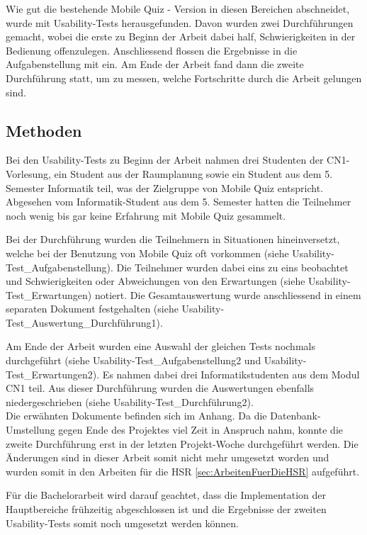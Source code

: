 Wie gut die bestehende Mobile Quiz - Version in diesen Bereichen abschneidet, wurde mit \gls{Usability-Test}s herausgefunden. Davon wurden zwei Durchführungen gemacht, wobei die erste zu Beginn der Arbeit dabei half, Schwierigkeiten in der Bedienung offenzulegen. Anschliessend flossen die Ergebnisse in die Aufgabenstellung mit ein. Am Ende der Arbeit fand dann die zweite Durchführung statt, um zu messen, welche Fortschritte durch die Arbeit gelungen sind.

\subsection{Methoden}
Bei den \gls{Usability-Test}s zu Beginn der Arbeit nahmen drei Studenten der \acrfull{CN1}-Vorlesung, ein Student aus der Raumplanung sowie ein Student aus dem 5. Semester Informatik teil, was der Zielgruppe von Mobile Quiz entspricht. Abgesehen vom Informatik-Student aus dem 5. Semester hatten die Teilnehmer noch wenig bis gar keine Erfahrung mit Mobile Quiz gesammelt.

Bei der Durchführung wurden die Teilnehmern in Situationen hineinversetzt, welche bei der Benutzung von Mobile Quiz oft vorkommen (siehe Usability-Test\_Aufgabenstellung). Die Teilnehmer wurden dabei eins zu eins beobachtet und Schwierigkeiten oder Abweichungen von den Erwartungen (siehe Usability-Test\_Erwartungen) notiert. Die Gesamtauswertung wurde anschliessend in einem separaten Dokument festgehalten (siehe Usability-Test\_Auswertung\_Durchführung1).

Am Ende der Arbeit wurden eine Auswahl der gleichen Tests nochmals durchgeführt (siehe Usability-Test\_Aufgabenstellung2 und Usability-Test\_Erwartungen2). Es nahmen dabei drei Informatikstudenten aus dem Modul \gls{CN1} teil. Aus dieser Durchführung wurden die Auswertungen ebenfalls niedergeschrieben (siehe Usability-Test\_Durchführung2).\\

Die erwähnten Dokumente befinden sich im Anhang. Da die Datenbank-Umstellung gegen Ende des Projektes viel Zeit in Anspruch nahm, konnte die zweite Durchführung erst in der letzten Projekt-Woche durchgeführt werden. Die Änderungen sind in dieser Arbeit somit nicht mehr umgesetzt worden und wurden somit in den Arbeiten für die HSR \ref{sec:ArbeitenFuerDieHSR} aufgeführt.

Für die Bachelorarbeit wird darauf geachtet, dass die Implementation der Hauptbereiche frühzeitig abgeschlossen ist und die Ergebnisse der zweiten Usability-Tests somit noch umgesetzt werden können. 


